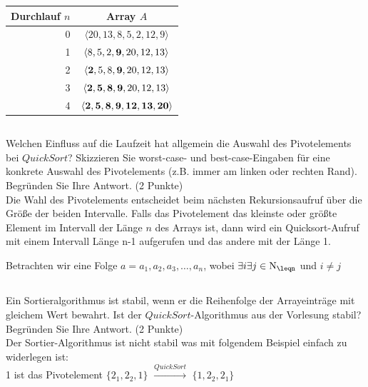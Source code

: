 \documentclass[11pt]{article}
\theoremstyle{remark}
\begin{document}
\begin{center}
    \begin{tabular}{|r|c|} \hline
        Durchlauf $n$ & Array $A$ \\ \hline
        0 & $\langle 20, 13, 8, 5, 2, 12, 9 \rangle$\\ \hline
        1 & $\langle 8, 5, 2, \bold{9}, 20, 12, 13 \rangle$\\ \hline
        2 & $\langle \bold{2}, 5, 8, \bold{9}, 20, 12, 13 \rangle$\\ \hline
        3 & $\langle \bold{2}, \bold{5}, \bold{8}, \bold{9}, 20, 12, 13 \rangle$\\ \hline
        4 & $\langle \bold{2}, \bold{5}, \bold{8}, \bold{9}, \bold{12}, \bold{13}, \bold{20} \rangle$\\ \hline
    \end{tabular}
\end{center}

\subsection{}
Welchen Einfluss auf die Laufzeit hat allgemein die Auswahl des Pivotelements bei
$QuickSort$? Skizzieren Sie worst-case- und best-case-Eingaben für eine konkrete
Auswahl des Pivotelements (z.B. immer am linken oder rechten Rand). Begründen
Sie Ihre Antwort. (2 Punkte)\\

Die Wahl des Pivotelements entscheidet beim nächsten Rekursionsaufruf über die Größe der beiden Intervalle. Falls das Pivotelement das kleinste oder größte Element im Intervall der Länge $n$ des Arrays ist, dann wird ein Quicksort-Aufruf mit einem Intervall Länge n-1 aufgerufen und das andere mit der Länge 1.

Betrachten wir eine Folge $a=a_1, a_2, a_3, \ldots, a_n$, wobei $\exists i\exists j \in \mathrm{N}_\leqn$ und $i \neq j$


\subsection{}
Ein Sortieralgorithmus ist stabil, wenn er die Reihenfolge der Arrayeinträge mit gleichem Wert bewahrt.
Ist der $QuickSort$-Algorithmus aus der Vorlesung stabil? Begründen Sie Ihre
Antwort. (2 Punkte)\\

Der Sortier-Algorithmus ist nicht stabil was mit folgendem Beispiel einfach zu widerlegen ist: \\
1 ist das Pivotelement 
$\{2_1, 2_2, 1\}$ $\xrightarrow{QuickSort}$ $\{1, 2_2, 2_1\}$\\
\end{document}
